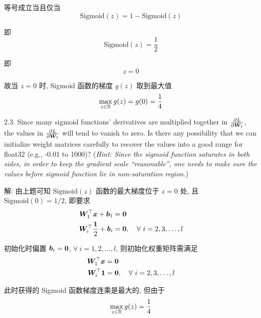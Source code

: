 \documentclass{article}
\begin{document}
等号成立当且仅当
\begin{equation}
  \mathrm{Sigmoid}(z)=1-\mathrm{Sigmoid}(z)
\end{equation}

即
\begin{equation}
  \mathrm{Sigmoid}(z)=\frac{1}{2}
\end{equation}

即
\begin{equation}
  z=0
\end{equation}

故当 $z=0$ 时, Sigmoid 函数的梯度 $g(z)$ 取到最大值
\begin{equation}
  \max_{z\in\mathbb{R}}g(z)=g(0)=\frac{1}{4}
\end{equation}

2.3. Since many sigmoid functions' derivatives are multiplied together in $\frac{\partial L}{\partial \bm{W}_1}$, the values in $\frac{\partial L}{\partial \bm{W}_1}$ will tend to vanish to zero. Is there any possibility that we can initialize weight matrices carefully to recover the values into a good range for float32 (e.g., -0.01 to 1000)? (\emph{Hint: Since the sigmoid function saturates in both sides, in order to keep the gradient scale ``reasonable'', one needs to make sure the values before sigmoid function lie in non-saturation region.})

解: 由上题可知 $\mathrm{Sigmoid}(z)$ 函数的最大梯度位于 $z=0$ 处, 且 $\mathrm{Sigmoid}(0)=1/2$, 即要求
\begin{equation}
  \begin{aligned}
    \bm{W}_1^\top\bm{x}+\bm{b}_1&=\bm{0}\\
    \bm{W}_i^\top\frac{\bm{1}}{2}+\bm{b}_i&=\bm{0},\quad\forall~i=2,3,\dots,l\\
  \end{aligned}
\end{equation}

初始化时偏置 $\bm{b}_i=\bm{0}$, $\forall~i=1,2,\dots,l$, 则初始化权重矩阵需满足
\begin{equation}
  \begin{aligned}
    \bm{W}_1^\top\bm{x}&=\bm{0}\\
    \bm{W}_i^\top\bm{1}&=\bm{0},\quad\forall~i=2,3,\dots,l\\
  \end{aligned}
\end{equation}

此时获得的 Sigmoid 函数梯度连乘是最大的, 但由于
\begin{equation}
  \max_{z\in\mathbb{R}} g(z)=\frac{1}{4}
\end{equation}
\end{document}
